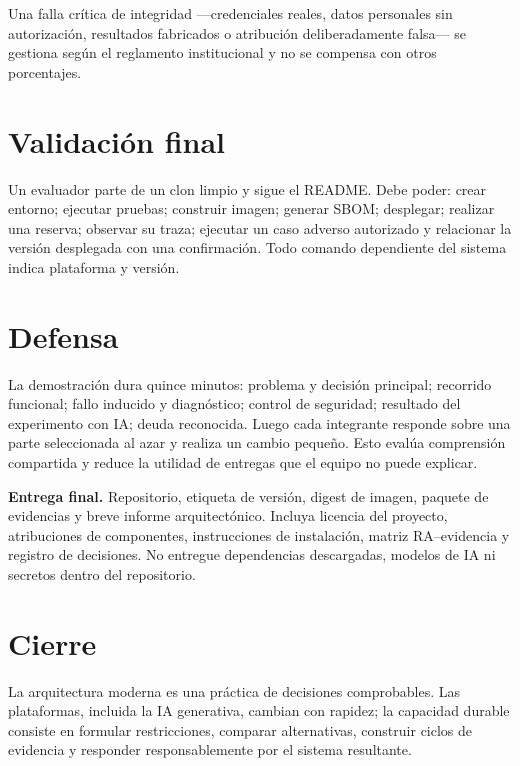 Una falla crítica de integridad ---credenciales reales, datos personales sin autorización, resultados fabricados o atribución deliberadamente falsa--- se gestiona según el reglamento institucional y no se compensa con otros porcentajes.

\section{Validación final}

\begin{validacion}
Un evaluador parte de un clon limpio y sigue el README. Debe poder: crear entorno; ejecutar pruebas; construir imagen; generar SBOM; desplegar; realizar una reserva; observar su traza; ejecutar un caso adverso autorizado y relacionar la versión desplegada con una confirmación. Todo comando dependiente del sistema indica plataforma y versión.
\end{validacion}

\section{Defensa}

La demostración dura quince minutos: problema y decisión principal; recorrido funcional; fallo inducido y diagnóstico; control de seguridad; resultado del experimento con IA; deuda reconocida. Luego cada integrante responde sobre una parte seleccionada al azar y realiza un cambio pequeño. Esto evalúa comprensión compartida y reduce la utilidad de entregas que el equipo no puede explicar.

\begin{ejercicio}
\textbf{Entrega final.} Repositorio, etiqueta de versión, digest de imagen, paquete de evidencias y breve informe arquitectónico. Incluya licencia del proyecto, atribuciones de componentes, instrucciones de instalación, matriz RA--evidencia y registro de decisiones. No entregue dependencias descargadas, modelos de IA ni secretos dentro del repositorio.
\end{ejercicio}

\section{Cierre}

La arquitectura moderna es una práctica de decisiones comprobables. Las plataformas, incluida la IA generativa, cambian con rapidez; la capacidad durable consiste en formular restricciones, comparar alternativas, construir ciclos de evidencia y responder responsablemente por el sistema resultante.

